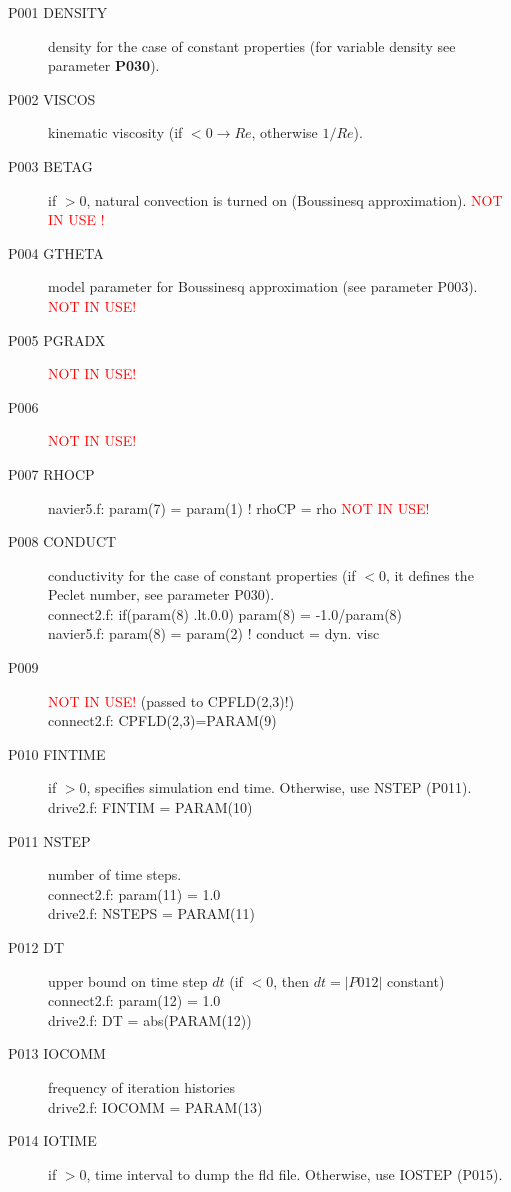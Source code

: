 \begin{description}
\item [P001  DENSITY] density for the case of constant properties (for variable density see parameter \textbf{P030}).
\item [P002  VISCOS]  kinematic viscosity (if $<0 \rightarrow Re$, otherwise $1/Re$).
\item [P003  BETAG] if $>0$, natural convection is turned on (Boussinesq approximation). {\textcolor{red}{NOT IN USE !}}
\item [P004  GTHETA] model parameter for Boussinesq approximation (see parameter P003). {\textcolor{red}{ NOT IN USE!}}
\item [P005  PGRADX] {\textcolor{red}{ NOT IN USE!}}
\item [P006  ] {\textcolor{red}{ NOT IN USE!}}
\item [P007  RHOCP] navier5.f:      param(7) = param(1)  ! rhoCP   = rho {\textcolor{red}{ NOT IN USE!}}
\item [P008  CONDUCT] conductivity for the case of constant properties (if $<0$, it defines the Peclet number, see parameter P030). \\
connect2.f:      if(param(8) .lt.0.0) param(8)  = -1.0/param(8)\\
navier5.f:      param(8) = param(2)  ! conduct = dyn. visc
\item [P009  ] {\textcolor{red}{ NOT IN USE!}} (passed to CPFLD(2,3)!)\\
connect2.f:      CPFLD(2,3)=PARAM(9)
\item [P010  FINTIME] if $>0$, specifies simulation end time. Otherwise, use NSTEP (P011).\\
drive2.f:      FINTIM = PARAM(10)
\item [P011  NSTEP] number of time steps.\\
connect2.f:            param(11) = 1.0\\
drive2.f:      NSTEPS = PARAM(11)
\item [P012  DT] upper bound on time step $dt$   (if $<0$, then $dt=|P012|$ constant)\\
connect2.f:            param(12) = 1.0\\
drive2.f:      DT     = abs(PARAM(12))
\item [P013  IOCOMM] frequency of iteration histories\\
drive2.f:      IOCOMM = PARAM(13)
\item [P014  IOTIME] if $>0$, time interval to dump the fld file. Otherwise, use IOSTEP (P015).\\

\end{description}
